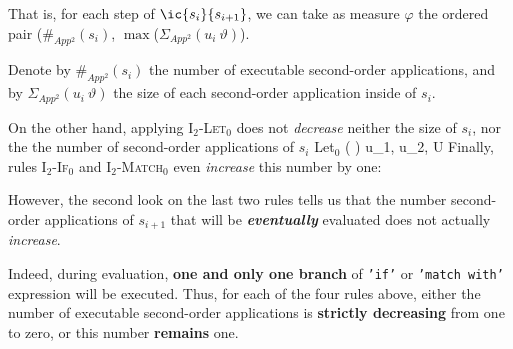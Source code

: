 	
	
	That is, for each step  of $\ic{s_{i}}{s_{i+1}}$, we can take as measure $\varphi$ the ordered pair ($\#_{App^2}(s_{i})$, $\max$($\Sigma_{App^2}(u_{i}~\vartheta)$).
	
		Denote by $\#_{App^2}(s_{i})$ the number of executable second-order applications, and by $\Sigma_{App^2}(u_{i}~\vartheta)$ the size of each second-order application inside of $s_{i}$. 
	
		
On the other hand, applying \textsc{I$_2$-Let$_0$} does not \textit{decrease} neither the size of $s_{i}$, nor the the number of second-order applications of $s_{i}$
		\icrulehead
		{Let$_0$}
		{(\boldsymbol{(}\boldsymbol{)} \boldsymbol{\vartheta})}
		{} 
		{u_1, u_2, \vartheta \in U}	
 Finally, rules \textsc{I$_2$-If$_0$} and \textsc{I$_2$-Match$_0$} even \textit{increase} this number by one:


	However, the second look on the last two rules tells us that the number second-order applications of $s_{i+1}$ that will be \textit{\textbf{eventually}} evaluated does not actually \textit{increase}.
	
	Indeed, during evaluation, \textbf{one and only one branch} of \texttt{'if'} or \texttt{'match with'} expression will be executed.
	Thus, for each of the four rules above, either the number of executable second-order applications is \textbf{strictly decreasing} from one to zero, or this number \textbf{remains} one. 


%

